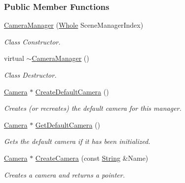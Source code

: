 \subsubsection*{Public Member Functions}
\begin{DoxyCompactItemize}
\item 
\hyperlink{classphys_1_1CameraManager_afdaf37b28708ed122f199437eb23ce32}{CameraManager} (\hyperlink{namespacephys_a460f6bc24c8dd347b05e0366ae34f34a}{Whole} SceneManagerIndex)
\begin{DoxyCompactList}\small\item\em Class Constructor. \item\end{DoxyCompactList}\item 
virtual \hyperlink{classphys_1_1CameraManager_a0b0f032477309eb47b0302fd5eef198c}{$\sim$CameraManager} ()
\begin{DoxyCompactList}\small\item\em Class Destructor. \item\end{DoxyCompactList}\item 
\hyperlink{classphys_1_1Camera}{Camera} $\ast$ \hyperlink{classphys_1_1CameraManager_a80f7dd510a31264d74e7f5a53bdf86a9}{CreateDefaultCamera} ()
\begin{DoxyCompactList}\small\item\em Creates (or recreates) the default camera for this manager. \item\end{DoxyCompactList}\item 
\hyperlink{classphys_1_1Camera}{Camera} $\ast$ \hyperlink{classphys_1_1CameraManager_ad7ef5b6a4ca501729c2d5d107d1bf392}{GetDefaultCamera} ()
\begin{DoxyCompactList}\small\item\em Gets the default camera if it has been initialized. \item\end{DoxyCompactList}\item 
\hyperlink{classphys_1_1Camera}{Camera} $\ast$ \hyperlink{classphys_1_1CameraManager_a3681545c19a96ae62032204a6f4a602b}{CreateCamera} (const \hyperlink{namespacephys_aa03900411993de7fbfec4789bc1d392e}{String} \&Name)
\begin{DoxyCompactList}\small\item\em Creates a camera and returns a pointer. \item\end{DoxyCompactList}\item 

\end{DoxyCompactItemize}
